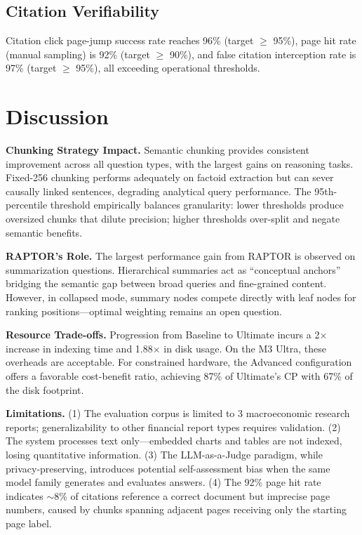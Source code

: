 \documentclass[11pt, a4paper]{article}
\begin{document}
\subsection{Citation Verifiability}

Citation click page-jump success rate reaches 96\% (target $\geq$ 95\%), page hit rate (manual sampling) is 92\% (target $\geq$ 90\%), and false citation interception rate is 97\% (target $\geq$ 95\%), all exceeding operational thresholds.

\section{Discussion}

\noindent\textbf{Chunking Strategy Impact.} Semantic chunking provides consistent improvement across all question types, with the largest gains on reasoning tasks. Fixed-256 chunking performs adequately on factoid extraction but can sever causally linked sentences, degrading analytical query performance. The 95th-percentile threshold empirically balances granularity: lower thresholds produce oversized chunks that dilute precision; higher thresholds over-split and negate semantic benefits.

\noindent\textbf{RAPTOR's Role.} The largest performance gain from RAPTOR is observed on summarization questions. Hierarchical summaries act as ``conceptual anchors'' bridging the semantic gap between broad queries and fine-grained content. However, in collapsed mode, summary nodes compete directly with leaf nodes for ranking positions---optimal weighting remains an open question.

\noindent\textbf{Resource Trade-offs.} Progression from Baseline to Ultimate incurs a 2$\times$ increase in indexing time and 1.88$\times$ in disk usage. On the M3 Ultra, these overheads are acceptable. For constrained hardware, the Advanced configuration offers a favorable cost-benefit ratio, achieving 87\% of Ultimate's CP with 67\% of the disk footprint.

\noindent\textbf{Limitations.} (1) The evaluation corpus is limited to 3 macroeconomic research reports; generalizability to other financial report types requires validation. (2) The system processes text only---embedded charts and tables are not indexed, losing quantitative information. (3) The LLM-as-a-Judge paradigm, while privacy-preserving, introduces potential self-assessment bias when the same model family generates and evaluates answers. (4) The 92\% page hit rate indicates $\sim$8\% of citations reference a correct document but imprecise page numbers, caused by chunks spanning adjacent pages receiving only the starting page label.
\end{document}
